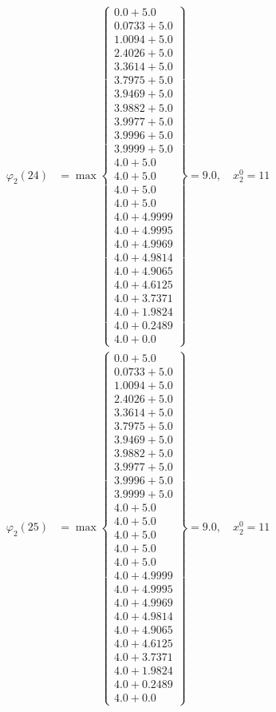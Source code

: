 \documentclass{article}
\begin{document}
\begin{align*}
\varphi_{2}(24) &= \max \left\{ \begin{array}{c}
0.0 + 5.0 \\
 0.0733 + 5.0 \\
 1.0094 + 5.0 \\
 2.4026 + 5.0 \\
 3.3614 + 5.0 \\
 3.7975 + 5.0 \\
 3.9469 + 5.0 \\
 3.9882 + 5.0 \\
 3.9977 + 5.0 \\
 3.9996 + 5.0 \\
 3.9999 + 5.0 \\
 4.0 + 5.0 \\
 4.0 + 5.0 \\
 4.0 + 5.0 \\
 4.0 + 5.0 \\
 4.0 + 4.9999 \\
 4.0 + 4.9995 \\
 4.0 + 4.9969 \\
 4.0 + 4.9814 \\
 4.0 + 4.9065 \\
 4.0 + 4.6125 \\
 4.0 + 3.7371 \\
 4.0 + 1.9824 \\
 4.0 + 0.2489 \\
 4.0 + 0.0
\end{array} \right\}=9.0, \quad x_{2}^0=11\\
  
\varphi_{2}(25) &= \max \left\{ \begin{array}{c}
0.0 + 5.0 \\
 0.0733 + 5.0 \\
 1.0094 + 5.0 \\
 2.4026 + 5.0 \\
 3.3614 + 5.0 \\
 3.7975 + 5.0 \\
 3.9469 + 5.0 \\
 3.9882 + 5.0 \\
 3.9977 + 5.0 \\
 3.9996 + 5.0 \\
 3.9999 + 5.0 \\
 4.0 + 5.0 \\
 4.0 + 5.0 \\
 4.0 + 5.0 \\
 4.0 + 5.0 \\
 4.0 + 5.0 \\
 4.0 + 4.9999 \\
 4.0 + 4.9995 \\
 4.0 + 4.9969 \\
 4.0 + 4.9814 \\
 4.0 + 4.9065 \\
 4.0 + 4.6125 \\
 4.0 + 3.7371 \\
 4.0 + 1.9824 \\
 4.0 + 0.2489 \\
 4.0 + 0.0
\end{array} \right\}=9.0, \quad x_{2}^0=11\\
  

\end{align*}
\end{document}
